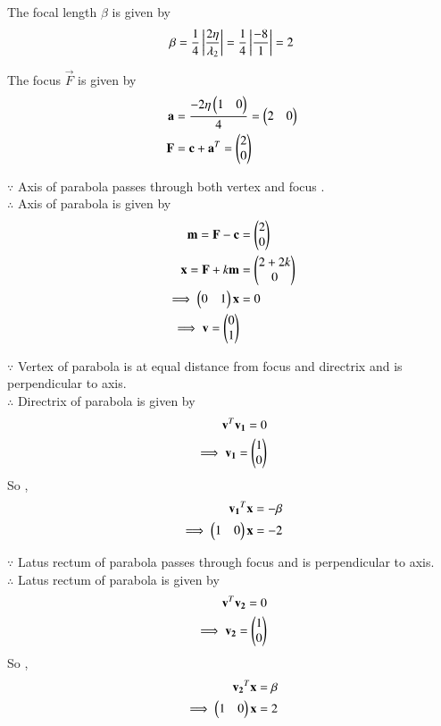 \documentclass[journal,12pt,twocolumn]{IEEEtran}
\begin{document}
The focal length $\beta$ is given by
\begin{align}
\beta = \frac{1}{4}\left\vert\frac{2\eta}{\lambda_2}\right\vert = \frac{1}{4}\left\vert\frac{-8}{1}\right\vert= 2
\end{align}

The focus $\vec{F}$ is given by
\begin{align}
\mathbf{a} &= \frac{-2\eta\begin{pmatrix}1 & 0\end{pmatrix}}{4} = \begin{pmatrix}2 & 0\end{pmatrix}
\\
\mathbf{F} &= \mathbf{c} + \mathbf{a}^T = \begin{pmatrix}2\\0\end{pmatrix}
\end{align}

$\because$
Axis of parabola passes through both vertex and focus .
\\
$\therefore$
Axis of parabola is given by
\begin{align}
\mathbf{m} =\mathbf{F} - \mathbf{c} &= \begin{pmatrix}2\\0\end{pmatrix}
\\
\mathbf{x} = \mathbf{F} + k\mathbf{m} &= \begin{pmatrix}2+2k \\ 0\end{pmatrix}
\\
\implies \begin{pmatrix}0 & 1\end{pmatrix}\mathbf{x} &= 0
\\
\implies \mathbf{v} = \begin{pmatrix}0 \\ 1\end{pmatrix}
\end{align}

$\because$
Vertex of parabola is at equal distance from focus and directrix and is perpendicular to axis.
\\
$\therefore$
Directrix of parabola is given by
\begin{align}
\mathbf{v}^T\mathbf{v_1} = 0
\\
\implies \mathbf{v_1} = \begin{pmatrix}1 \\ 0\end{pmatrix}
\end{align}
So , 
\begin{align}
\mathbf{v_1}^T\mathbf{x} = -\beta
\\
\implies \begin{pmatrix}1 & 0\end{pmatrix}\mathbf{x} = -2
\end{align}

$\because$
Latus rectum of parabola passes through focus and is perpendicular to axis.
\\
$\therefore$
Latus rectum of parabola is given by
\begin{align}
\mathbf{v}^T\mathbf{v_2} = 0
\\
\implies \mathbf{v_2} = \begin{pmatrix}1 \\ 0\end{pmatrix}
\end{align}
So , 
\begin{align}
\mathbf{v_2}^T\mathbf{x} = \beta
\\
\implies \begin{pmatrix}1 & 0\end{pmatrix}\mathbf{x} = 2
\end{align}
\end{document}
